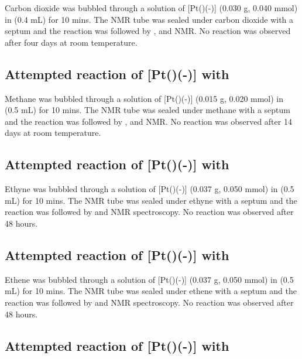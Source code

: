 Carbon dioxide was bubbled through a solution of [Pt(\tButhixantphos)(-)] (0.030 g, 0.040 mmol) in  (0.4 mL) for 10 mins.  The NMR tube was sealed under carbon dioxide with a septum and the reaction was followed by \proton{}, \carbon{} and \phosphorus{} NMR.  No reaction was observed after four days at room temperature.  

\subsection*{Attempted reaction of \texorpdfstring{[Pt(\tButhixantphos)(-)]} P with \texorpdfstring{} C}

Methane was bubbled through a solution of [Pt(\tButhixantphos)(-)] (0.015 g, 0.020 mmol)  in  (0.5 mL) for 10 mins.  The NMR tube was sealed under methane with a septum and the reaction was followed by \proton{}, \carbon{} and \phosphorus{} NMR.  No reaction was observed after 14 days at room temperature.

\subsection*{Attempted reaction of \texorpdfstring{[Pt(\tButhixantphos)(-)]} P with \texorpdfstring{} C}

Ethyne was bubbled through a solution of [Pt(\tButhixantphos)(-)] (0.037 g, 0.050 mmol) in  (0.5 mL) for 10 mins.  The NMR tube was sealed under ethyne with a septum and the reaction was followed by \proton{} and \phosphorus{} NMR spectroscopy.  No reaction was observed after 48 hours.

\subsection*{Attempted reaction of \texorpdfstring{[Pt(\tButhixantphos)(-)]} P with \texorpdfstring{} C}

Ethene was bubbled through a solution of [Pt(\tButhixantphos)(-)] (0.037 g, 0.050 mmol) in  (0.5 mL) for 10 mins.  The NMR tube was sealed under ethene with a septum and the reaction was followed by \proton{} and \phosphorus{} NMR spectroscopy.  No reaction was observed after 48 hours.

\subsection*{Attempted reaction of \texorpdfstring{[Pt(\tButhixantphos)(-)]} P with \texorpdfstring{} N}

